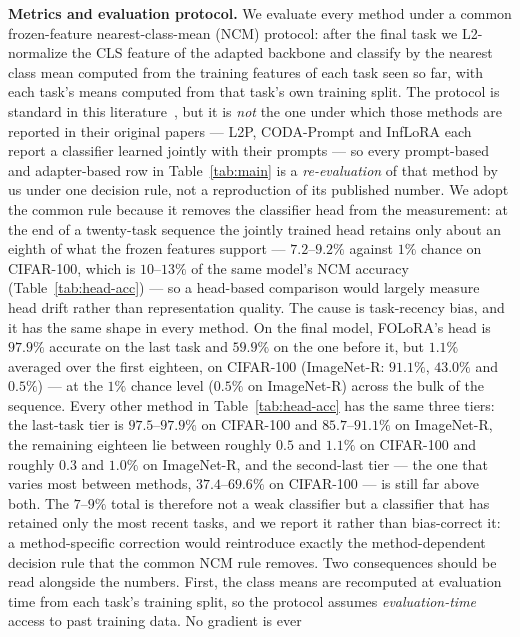 \textbf{Metrics and evaluation protocol.} We evaluate every method under a common
frozen-feature nearest-class-mean (NCM) protocol: after the final task we L2-normalize the
CLS feature of the adapted backbone and classify by the nearest class mean computed from
the training features of each task seen so far, with each task's means computed from that
task's own training split. The protocol is standard in this
literature~\cite{wang2022l2p,smith2023coda,liang2024inflora}, but it is \emph{not} the one
under which those methods are reported in their original papers --- L2P, CODA-Prompt and
InfLoRA each report a classifier learned jointly with their prompts --- so every
prompt-based and adapter-based row in Table~\ref{tab:main} is a \emph{re-evaluation} of
that method by us under one decision rule, not a reproduction of its published number. We
adopt the common rule because it removes the classifier head from the measurement: at the
end of a twenty-task sequence the jointly trained head retains only about an eighth of what
the frozen features support --- $7.2$--$9.2\%$ against $1\%$ chance on CIFAR-100, which is
$10$--$13\%$ of the same model's NCM accuracy (Table~\ref{tab:head-acc}) --- so a head-based
comparison would largely measure head drift rather than representation quality. The cause is
task-recency bias, and it has the same shape in every method. On the final model, FOLoRA's
head is $97.9\%$ accurate on the last task and $59.9\%$ on the one before it, but $1.1\%$
averaged over the first eighteen, on CIFAR-100 (ImageNet-R: $91.1\%$, $43.0\%$ and $0.5\%$)
--- at the $1\%$ chance level ($0.5\%$ on ImageNet-R) across the bulk of the sequence. Every
other method in Table~\ref{tab:head-acc} has the same three tiers: the last-task tier is
$97.5$--$97.9\%$ on CIFAR-100 and $85.7$--$91.1\%$ on ImageNet-R, the remaining eighteen lie
between roughly $0.5$ and $1.1\%$ on CIFAR-100 and roughly $0.3$ and $1.0\%$ on ImageNet-R, and the
second-last tier --- the one that varies most between methods, $37.4$--$69.6\%$ on
CIFAR-100 --- is still far above both. The
$7$--$9\%$ total is therefore not a weak classifier but a
classifier that has retained only the most recent tasks, and we report it rather than
bias-correct it: a method-specific correction would reintroduce exactly the
method-dependent decision rule that the common NCM rule removes.
Two consequences should be read alongside the numbers. First, the
class means are recomputed at evaluation time from each task's training split, so the
protocol assumes \emph{evaluation-time} access to past training data. No gradient is ever

